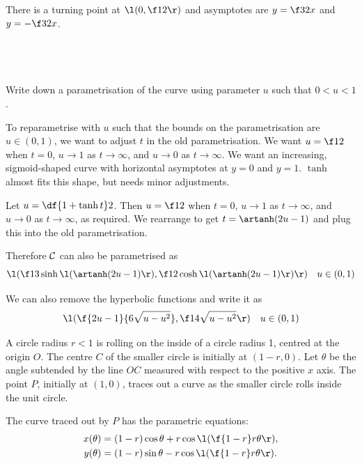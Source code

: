 \documentclass[a4paper]{article}
\begin{document}
There is a turning point at $\l(0, \f12\r)$ and asymptotes are $y = \f32 x$ and $y = -\f32 x$.

\newpage
\subsection{~} %

\begin{questionbody}
Write down a parametrisation of the curve using parameter $u$ such that $0 < u < 1$.
\end{questionbody}

To reparametrise with $u$ such that the bounds on the parametrisation are $u \in (0, 1)$, we want to adjust $t$ in the old parametrisation. We want $u = \f12$ when $t = 0$, $u \to 1$ as $t \to \infty$, and $u \to 0$ as $t \to \infty$. We want an increasing, sigmoid-shaped curve with horizontal asymptotes at $y=0$ and $y=1$. $\tanh$ almost fits this shape, but needs minor adjustments.

Let $u = \df{1 + \tanh t}2$. Then $u = \f12$ when $t = 0$, $u \to 1$ as $t \to \infty$, and $u \to 0$ as $t \to \infty$, as required. We rearrange to get $t = \artanh(2u - 1)$ and plug this into the old parametrisation.

Therefore $\cal C$ can also be parametrised as $$\l( \f13 \sinh\l(\artanh(2u - 1)\r), \f12 \cosh\l(\artanh(2u - 1)\r) \r) \quad u \in (0, 1)$$

We can also remove the hyperbolic functions and write it as $$\l( \f{2u-1}{6\sqrt{u - u^2}}, \f1{4\sqrt{u - u^2}} \r) \quad u \in (0, 1)$$


\begin{questionbody}
A circle radius $r < 1$ is rolling on the inside of a circle radius 1, centred at the origin $O$. The centre $C$ of the smaller circle is initially at $(1 - r, 0)$. Let $\theta$ be the angle subtended by the line $OC$ measured with respect to the positive $x$ axis. The point $P$, initially at $(1, 0)$, traces out a curve as the smaller circle rolls inside the unit circle.

The curve traced out by $P$ has the parametric equations: \begin{align*}
x(\theta) &= (1 - r) \cos \theta + r \cos \l( \f{1-r}r \theta \r) , \\
y(\theta) &= (1 - r) \sin \theta - r \cos \l( \f{1-r}r \theta \r) .
\end{align*}
\end{questionbody}
\end{document}
